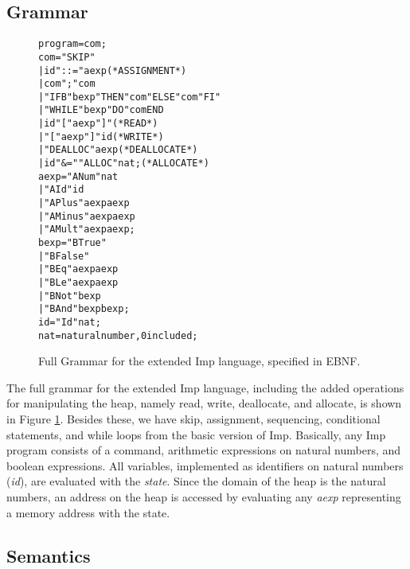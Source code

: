 \subsection{Grammar}

\begin{figure}
\begin{alltt}
                  program = com ;
                  com =   "SKIP"
                        | id "::=" aexp            (* ASSIGNMENT *)
                        | com ";" com
                        | "IFB" bexp "THEN" com "ELSE" com "FI"
                        | "WHILE" bexp "DO" com END
                        | id \lsquigarr "[" aexp "]"       (* READ *)
                        | "[" aexp "]" \lsquigarr id       (* WRITE *)
                        | "DEALLOC" aexp           (* DEALLOCATE *)
                        | id "&=" "ALLOC" nat ;    (* ALLOCATE *)
                  aexp =  "ANum" nat
                        | "AId" id
                        | "APlus" aexp aexp
                        | "AMinus" aexp aexp
                        | "AMult" aexp aexp ;
                  bexp =  "BTrue"
                        | "BFalse"
                        | "BEq" aexp aexp
                        | "BLe" aexp aexp
                        | "BNot" bexp
                        | "BAnd" bexp bexp ;
                  id = "Id" nat ;
                  nat = natural number, 0 included ;
\end{alltt}
\caption{Full Grammar for the extended Imp language, specified in EBNF.}
\label{fig:imp_grammar}
\end{figure}

The full grammar for the extended Imp language, including the added operations for manipulating the heap, namely read, write, deallocate, and allocate, is shown in Figure \ref{fig:imp_grammar}. Besides these, we have skip, assignment, sequencing, conditional statements, and while loops from the basic version of Imp. Basically, any Imp program consists of a command, arithmetic expressions on natural numbers, and boolean expressions. All variables, implemented as identifiers on natural numbers ({\it id}), are evaluated with the {\it state}. Since the domain of the heap is the natural numbers, an address on the heap is accessed by evaluating any {\it aexp} representing a memory address with the state.

\subsection{Semantics}

